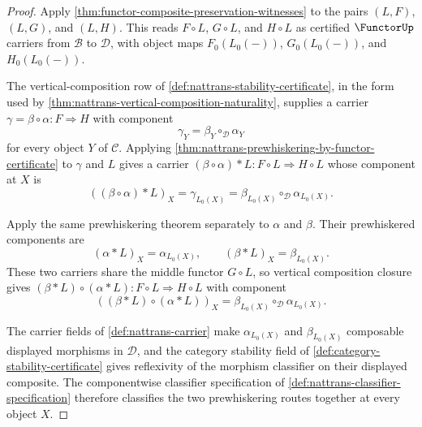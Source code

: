 \begin{proof}
Apply \autoref{thm:functor-composite-preservation-witnesses} to the pairs $(L,F)$, $(L,G)$, and $(L,H)$. This reads $F\circ L$, $G\circ L$, and $H\circ L$ as certified $\FunctorUp$ carriers from $\mathcal B$ to $\mathcal D$, with object maps $F_0(L_0(-))$, $G_0(L_0(-))$, and $H_0(L_0(-))$.

The vertical-composition row of \autoref{def:nattrans-stability-certificate}, in the form used by \autoref{thm:nattrans-vertical-composition-naturality}, supplies a carrier $\gamma=\beta\circ\alpha:F\Rightarrow H$ with component
$$
\gamma_Y=\beta_Y\circ_{\mathcal D}\alpha_Y
$$
for every object $Y$ of $\mathcal C$. Applying \autoref{thm:nattrans-prewhiskering-by-functor-certificate} to $\gamma$ and $L$ gives a carrier $(\beta\circ\alpha)\ast L:F\circ L\Rightarrow H\circ L$ whose component at $X$ is
$$
((\beta\circ\alpha)\ast L)_X=\gamma_{L_0(X)}
=\beta_{L_0(X)}\circ_{\mathcal D}\alpha_{L_0(X)}.
$$

Apply the same prewhiskering theorem separately to $\alpha$ and $\beta$. Their prewhiskered components are
$$
(\alpha\ast L)_X=\alpha_{L_0(X)},
\qquad
(\beta\ast L)_X=\beta_{L_0(X)}.
$$
These two carriers share the middle functor $G\circ L$, so vertical composition closure gives $(\beta\ast L)\circ(\alpha\ast L):F\circ L\Rightarrow H\circ L$ with component
$$
((\beta\ast L)\circ(\alpha\ast L))_X
=\beta_{L_0(X)}\circ_{\mathcal D}\alpha_{L_0(X)}.
$$

The carrier fields of \autoref{def:nattrans-carrier} make $\alpha_{L_0(X)}$ and $\beta_{L_0(X)}$ composable displayed morphisms in $\mathcal D$, and the category stability field of \autoref{def:category-stability-certificate} gives reflexivity of the morphism classifier on their displayed composite. The componentwise classifier specification of \autoref{def:nattrans-classifier-specification} therefore classifies the two prewhiskering routes together at every object $X$.
\end{proof}
